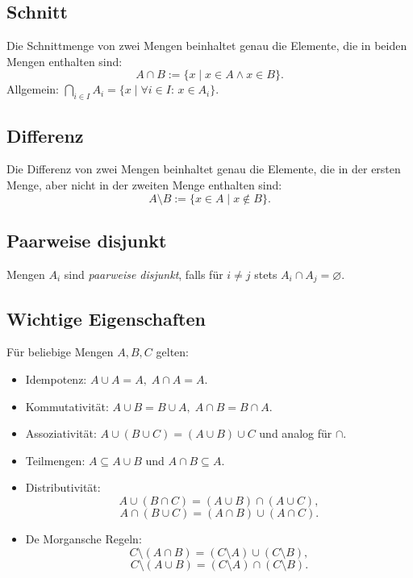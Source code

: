 \documentclass[10pt,landscape]{article}
\begin{document}
\begin{multicols*}{4}
\subsection{Schnitt}
Die Schnittmenge von zwei Mengen beinhaltet genau die Elemente, die in beiden Mengen enthalten sind:
\[
A\cap B:=\{x\mid x\in A\wedge x\in B\}.
\]
Allgemein: \(\displaystyle\bigcap_{i\in I} A_i=\{x\mid\forall i\in I:\,x\in A_i\}.\)

\subsection{Differenz}
Die Differenz von zwei Mengen beinhaltet genau die Elemente, die in der ersten Menge, aber nicht in der zweiten Menge enthalten sind:
\[
A\setminus B:=\{x\in A\mid x\notin B\}.
\]

\subsection{Paarweise disjunkt}
Mengen \(A_i\) sind \emph{paarweise disjunkt}, falls für \(i\neq j\) stets \(A_i\cap A_j=\varnothing\).

\subsection{Wichtige Eigenschaften}
Für beliebige Mengen \(A,B,C\) gelten:
\begin{itemize}[noitemsep]
  \item Idempotenz: \(A\cup A=A,\; A\cap A=A\).
  \item Kommutativität: \(A\cup B=B\cup A,\; A\cap B=B\cap A\).
  \item Assoziativität: \(A\cup(B\cup C)=(A\cup B)\cup C\) und analog für \(\cap\).
  \item Teilmengen: \(A\subseteq A\cup B\) und \(A\cap B\subseteq A\).
  \item Distributivität:
  \[
  A\cup(B\cap C)=(A\cup B)\cap(A\cup C),
  \]
  \[
  A\cap(B\cup C)=(A\cap B)\cup(A\cap C).
  \]
  \item De Morgansche Regeln:
  \[
  C\setminus(A\cap B)=(C\setminus A)\cup(C\setminus B),
  \]
  \[
  C\setminus(A\cup B)=(C\setminus A)\cap(C\setminus B).
  \]
\end{itemize}


\end{multicols*}
\end{document}
